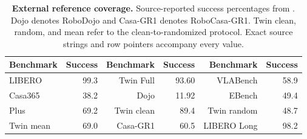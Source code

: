 \begin{table}[H]
\centering
\begingroup\fontsize{9}{10.5}\selectfont
\setlength{\tabcolsep}{3.5pt}\renewcommand{\arraystretch}{1.12}
\begin{tabularx}{\linewidth}{lRRRRR}
\toprule
{}
Benchmark & Success & Benchmark & Success & Benchmark & Success \\
\midrule
LIBERO & 99.3 & Twin Full & 93.60 & VLABench & 58.9 \\
Casa365 & 38.2 & Dojo & 11.92 & EBench & 49.4 \\
Plus & 69.2 & Twin clean & 89.4 & Twin random & 48.7 \\
Twin mean & 69.0 & Casa-GR1 & 60.5 & LIBERO Long & 98.2 \\
\bottomrule
\end{tabularx}
\endgroup
\caption{\textbf{External reference coverage.} Source-reported success percentages from . Dojo denotes RoboDojo and Casa-GR1 denotes RoboCasa-GR1. Twin clean, random, and mean refer to the clean-to-randomized protocol. Exact source strings and row pointers accompany every value.}
\label{tab:reference}
\end{table}
